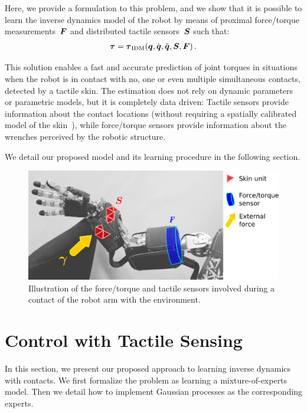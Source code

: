        Here, we provide a formulation to this problem, and we show that it is possible to learn the inverse dynamics model of the robot by means of proximal force/torque measurements~$\boldsymbol{F}$ and distributed tactile sensors~$\mathcal{\boldsymbol{S}}$ such that:
        \begin{align}
        	\boldsymbol{\tau} = \boldsymbol{\tau}_\text{IDM}(\boldsymbol q,\dot{\boldsymbol q},\ddot{\boldsymbol q},\mathcal{\boldsymbol{S}},\boldsymbol{F}) \,.
            \label{eq:robIROS_torques}
        \end{align}

        This solution enables a fast and accurate prediction of joint torques in situations when the robot is in contact with no, one or even multiple simultaneous contacts, detected by a tactile skin.
        The estimation does not rely on dynamic parameters or parametric models, but it is completely data driven: Tactile sensors provide information about the contact locations (without requiring a spatially calibrated model of the skin~\cite{DelPrete2011}), while force/torque sensors provide information about the wrenches perceived by the robotic structure.

        We detail our proposed model and its learning procedure in the following section.

%
\begin{figure}[t]
  \centering
  \includegraphics[width=.5\columnwidth]{robertoIROS/fig/concept_gray}		
  \caption{Illustration of the force/torque and tactile sensors involved during a contact of the robot arm with the environment.}
  \label{fig:robIROS_concept}
\end{figure}
%


\section{Control with Tactile Sensing} 
\label{sec:robIROS_method}



In this section, we present our proposed approach to learning inverse dynamics with contacts.
We first formalize the problem as learning a mixture-of-experts model.
Then we detail how to implement Gaussian processes as the corresponding experts.



